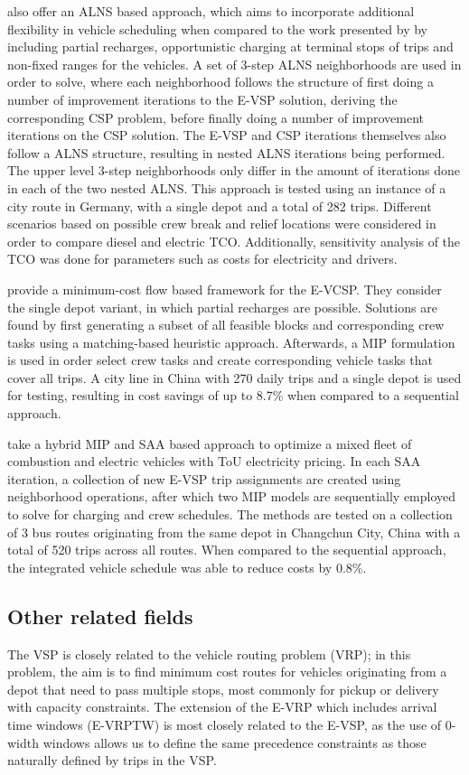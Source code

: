 \documentclass[]{article}
\begin{document}
\citet{Sistig2023} also offer an ALNS based approach, which aims to incorporate additional flexibility in vehicle scheduling when compared to the work presented by \citet{Perumal2021} by including partial recharges, opportunistic charging at terminal stops of trips and non-fixed ranges for the vehicles. A set of 3-step ALNS neighborhoods are used in order to solve, where each neighborhood follows the structure of first doing a number of improvement iterations to the E-VSP solution, deriving the corresponding CSP problem, before finally doing a number of improvement iterations on the CSP solution. The E-VSP and CSP iterations themselves also follow a ALNS structure, resulting in nested ALNS iterations being performed. The upper level 3-step neighborhoods only differ in the amount of iterations done in each of the two nested ALNS. This approach is tested using an instance of a city route in Germany, with a single depot and a total of 282 trips. Different scenarios based on possible crew break and relief locations were considered in order to compare diesel and electric TCO. Additionally, sensitivity analysis of the TCO was done for parameters such as costs for electricity and drivers.

\citet{Shen2023} provide a minimum-cost flow based framework for the E-VCSP. They consider the single depot variant, in which partial recharges are possible. Solutions are found by first generating a subset of all feasible blocks and corresponding crew tasks using a matching-based heuristic approach. Afterwards, a MIP formulation is used in order select crew tasks and create corresponding vehicle tasks that cover all trips. A city line in China with 270 daily trips and a single depot is used for testing, resulting in cost savings of up to 8.7\% when compared to a sequential approach.

\citet{Cong2024} take a hybrid MIP and SAA based approach to optimize a mixed fleet of combustion and electric vehicles with ToU electricity pricing. In each SAA iteration, a collection of new E-VSP trip assignments are created using neighborhood operations, after which two MIP models are sequentially employed to solve for charging and crew schedules. The methods are tested on a collection of 3 bus routes originating from the same depot in Changchun City, China with a total of 520 trips across all routes. When compared to the sequential approach, the integrated vehicle schedule was able to reduce costs by 0.8\%. 

\subsection{Other related fields}
The VSP is closely related to the vehicle routing problem (VRP); in this problem, the aim is to find minimum cost routes for vehicles originating from a depot that need to pass multiple stops, most commonly for pickup or delivery with capacity constraints. The extension of the E-VRP which includes arrival time windows (E-VRPTW) is most closely related to the E-VSP, as the use of 0-width windows allows us to define the same precedence constraints as those naturally defined by trips in the VSP.
\end{document}
